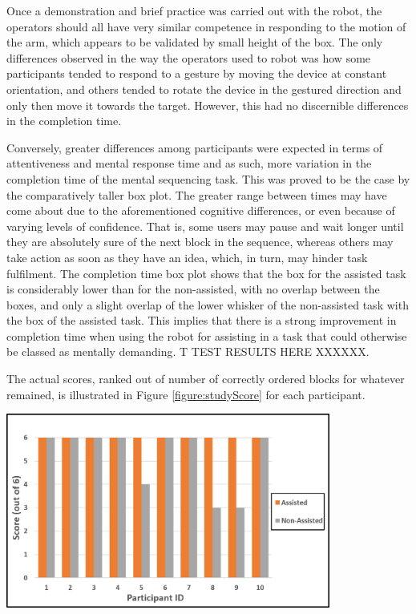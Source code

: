 \documentclass[11pt]{article}
\begin{document}
Once a demonstration and brief practice was carried out with the robot, the operators should all have very similar competence in responding to the motion of the arm, which appears to be validated by small height of the box. The only differences observed in the way the operators used to robot was how some participants tended to respond to a gesture by moving the device at constant orientation, and others tended to rotate the device in the gestured direction and only then move it towards the target. However, this had no discernible differences in the completion time. 

Conversely, greater differences among participants were expected in terms of attentiveness and mental response time and as such, more variation in the completion time of the mental sequencing task. This was proved to be the case by the comparatively taller box plot. The greater range between times may have come about due to the aforementioned cognitive differences, or even because of varying levels of confidence. That is, some users may pause and wait longer until they are absolutely sure of the next block in the sequence, whereas others may take action as soon as they have an idea, which, in turn, may hinder task fulfilment. The completion time box plot shows that the box for the assisted task is considerably lower than for the non-assisted, with no overlap between the boxes, and only a slight overlap of the lower whisker of the non-assisted task with the box of the assisted task. This implies that there is a strong improvement in completion time when using the robot for assisting in a task that could otherwise be classed as mentally demanding. T TEST RESULTS HERE XXXXXX. 

The actual scores, ranked out of number of correctly ordered blocks for whatever remained, is illustrated in Figure \ref{figure:studyScore} for each participant. 


\begin{center}
\includegraphics[width=0.8\textwidth]{images/studyScore.png}
\label{figure:studyScore}
\end{center}
\end{document}
